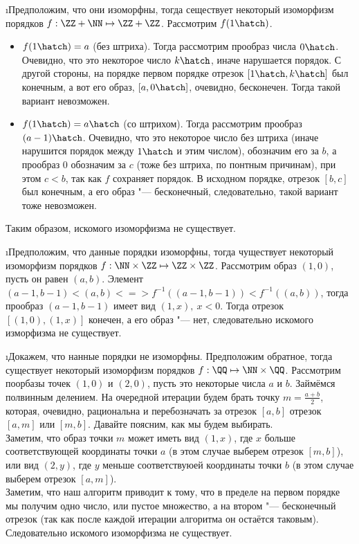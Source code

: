 \i Предположим, что они изоморфны, тогда сеществует некоторый изоморфизм порядков $f: \ZZ + \NN \mapsto \ZZ + \ZZ$. Рассмотрим $f(1\hatch)$.
\begin{itemize}
    \item $f(1\hatch) = a$ (без штриха). Тогда рассмотрим прообраз числа $0\hatch$. Очевидно, что это некоторое число $k\hatch$, иначе нарушается порядок. С другой стороны, на порядке первом порядке отрезок $[1\hatch, k\hatch]$ был конечным, а вот его образ, $[a, 0\hatch]$, очевидно, бесконечен. Тогда такой вариант невозможен.
    \item $f(1\hatch) = a\hatch$ (со штрихом). Тогда рассмотрим прообраз $(a-1)\hatch$. Очевидно, что это некоторое число без штриха (иначе нарушится порядок между $1\hatch$ и этим числом), обозначим его за $b$, а прообраз $0$ обозначим за $c$ (тоже без штриха, по понтным причинам), при этом $c < b$, так как $f$ сохраняет порядок. В исходном порядке, отрезок $[b, c]$ был конечным, а его образ "--- бесконечный, следовательно, такой вариант тоже невозможен.
\end{itemize}
Таким образом, искомого изоморфизма не существует.

\i Предположим, что данные порядки изоморфны, тогда чуществует некоторый изоморфизм порядков $f: \NN \times \ZZ \mapsto \ZZ \times \ZZ$. Рассмотрим образ $(1, 0)$, пусть он равен $(a, b)$. Элемент $(a-1, b-1) < (a, b) <=> f^{-1}((a-1, b-1)) < f^{-1}((a, b))$, тогда прообраз $(a-1, b-1)$ имеет вид $(1, x), \ x < 0$. Тогда отрезок $[(1, 0), (1, x)]$ конечен, а его образ "--- нет, следовательно искомого изморфизма не существует.

\i Докажем, что нанные порядки не изоморфны. Предположим обратное, тогда существует некоторый изоморфизм порядков $f: \QQ \mapsto \NN \times \QQ$.  Рассмотрим поорбазы точек $(1, 0)$ и $(2, 0)$, пусть это некоторые числа $a$ и $b$. Займёмся полвинным делением. На очередной итерации будем брать точку $m = \frac{a+b}{2}$, которая, очевидно, рациональна и перебозначать за отрезок $[a, b]$ отрезок $[a, m]$ или $[m, b]$. Давайте поясним, как мы будем выбирать.\\
Заметим, что образ точки $m$ может иметь вид $(1, x)$, где $x$ больше соответствующей координаты точки $a$ (в этом случае выберем отрезок $[m, b]$), или вид $(2, y)$, где $y$ меньше соответствуюей координаты точки $b$ (в этом случае выберем отрезок $[a, m]$).\\
Заметим, что наш алгоритм приводит к тому, что в пределе на первом порядке мы получим одно число, или пустое множество, а на втором "--- бесконечный отрезок (так как после каждой итерации алгоритма он остаётся таковым). Следовательно искомого изоморфизма не существует.

